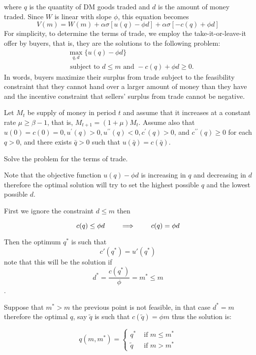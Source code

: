 \documentclass[12pt]{amsart}
\begin{document}
{{\begin{exercise}
where $q$ is the quantity of DM goods traded and $d$ is the amount of money traded. Since $W$ is linear with slope $\phi$, this equation becomes
$$
V(m)=W(m)+\alpha \sigma[u(q)-\phi d]+\alpha \sigma[-c(q)+\phi d]
$$
For simplicity, to determine the terms of trade, we employ the take-it-or-leave-it offer by buyers, that is, they are the solutions to the following problem:
$$
\begin{aligned}
&\max _{q, d}\{u(q)-\phi d\} \\
&\text { subject to } d \leq m \text { and }-c(q)+\phi d \geq 0 .
\end{aligned}
$$
In words, buyers maximize their surplus from trade subject to the feasibility constraint that they cannot hand over a larger amount of money than they have and the incentive constraint that sellers' surplus from trade cannot be negative.

Let $M_{t}$ be supply of money in period $t$ and assume that it increases at a constant rate $\mu \geq \beta-1$, that is, $M_{t+1}=(1+\mu) M_{t}$. Assume also that $u(0)=c(0)=0, u^{\prime}(q)>0, u^{\prime \prime}(q)<0, c^{\prime}(q)>0$, and $c^{\prime \prime}(q) \geq 0$ for each $q>0$, and there exists $\bar{q}>0$ such that $u(\bar{q})=c(\bar{q})$.
\end{exercise}

\begin{subexercise}
Solve the problem for the terms of trade.
\end{subexercise}

\begin{answer}
Note that the objective function $u(q)-\phi d$ is increasing in $q$ and decreasing in $d$ therefore the optimal solution will try to set the highest possible $q$ and the lowest possible $d$. 

First we ignore the constraint $d\leq m$ then

$$c(q) \leq \phi d \qquad \implies \qquad c(q) = \phi d$$

Then the optimum  $q^*$ is such that $$c'(q^*) = u'(q^*)$$ note that this will be the solution if $$d^* = \frac{c(q^*)}{\phi} = m^* \leq m $$.

Suppose that $m^*>m$ the previous point is not feasible, in that case $d^* = m$ therefore the optimal $q$, say $\tilde{q}$ is such that $c(\tilde{q}) = \phi m$ thus the solution is:

$$
\boxed{
q(m, m^*) = \left\{
\begin{array}{cc}
    q^* &  \text{ if } m\leq m^* \\
    \tilde{q} & \text{ if } m>m^*
\end{array}
\right.
}
$$


\end{answer}}}
\end{document}
